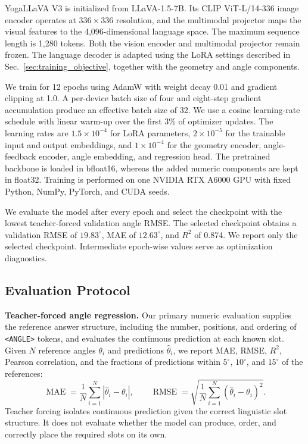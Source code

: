 YogaLLaVA V3 is initialized from LLaVA-1.5-7B.
Its CLIP ViT-L/14-336 image encoder operates at $336\!\times\!336$ resolution, and the multimodal projector maps the visual features to the 4,096-dimensional language space.
The maximum sequence length is 1,280 tokens.
Both the vision encoder and multimodal projector remain frozen.
The language decoder is adapted using the LoRA settings described in Sec.~\ref{sec:training_objective}, together with the geometry and angle components.

We train for 12 epochs using AdamW with weight decay 0.01 and gradient clipping at 1.0.
A per-device batch size of four and eight-step gradient accumulation produce an effective batch size of 32.
We use a cosine learning-rate schedule with linear warm-up over the first 3\% of optimizer updates.
The learning rates are $1.5\!\times\!10^{-4}$ for LoRA parameters, $2\!\times\!10^{-5}$ for the trainable input and output embeddings, and $1\!\times\!10^{-4}$ for the geometry encoder, angle-feedback encoder, angle embedding, and regression head.
The pretrained backbone is loaded in bfloat16, whereas the added numeric components are kept in float32.
Training is performed on one NVIDIA RTX A6000 GPU with fixed Python, NumPy, PyTorch, and CUDA seeds.

We evaluate the model after every epoch and select the checkpoint with the lowest teacher-forced validation angle RMSE.
The selected checkpoint obtains a validation RMSE of $19.83^\circ$, MAE of $12.63^\circ$, and $R^2$ of 0.874.
We report only the selected checkpoint.
Intermediate epoch-wise values serve as optimization diagnostics.

\subsection{Evaluation Protocol}
\label{sec:evaluation_protocol}

\noindent\textbf{Teacher-forced angle regression.}
Our primary numeric evaluation supplies the reference answer structure, including the number, positions, and ordering of \texttt{<ANGLE>} tokens, and evaluates the continuous prediction at each known slot.
Given $N$ reference angles $\theta_i$ and predictions $\widehat{\theta}_i$, we report MAE, RMSE, $R^2$, Pearson correlation, and the fractions of predictions within $5^\circ$, $10^\circ$, and $15^\circ$ of the references:
\begin{equation}
\operatorname{MAE}=\frac{1}{N}\sum_{i=1}^{N}
\left|\widehat{\theta}_i-\theta_i\right|,
\qquad
\operatorname{RMSE}=\sqrt{\frac{1}{N}\sum_{i=1}^{N}
(\widehat{\theta}_i-\theta_i)^2}.
\label{eq:evaluation_errors}
\end{equation}
Teacher forcing isolates continuous prediction given the correct linguistic slot structure.
It does not evaluate whether the model can produce, order, and correctly place the required slots on its own.

